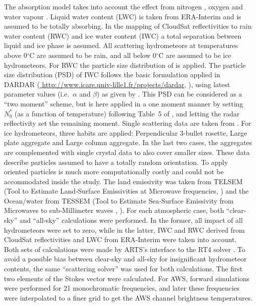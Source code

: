 \documentclass[amt, manuscript]{copernicus}
\begin{document}
The absorption model takes into account the effect from nitrogen
\citep{pwr:93}, oxygen \citep{pwr:93} and water vapour 
\citep{ellison2007permittivity}. Liquid water content (LWC) is taken from ERA-Interim \citep{dee2011erainterim} and is assumed
to be totally absorbing. In the mapping of CloudSat reflectivities to rain water content (RWC) and
ice water content (IWC) a total separation between liquid and ice phase is assumed. All scattering
hydrometeors at temperatures above 0$^\circ$C are assumed to be rain, and all
below 0$^\circ$C are assumed to be ice hydrometeors. For RWC the particle size
distribution of \citet{abel2012improved} is applied. The particle size distribution (PSD) of IWC follows the basic formulation applied in DARDAR (\url{
http://www.icare.univ-lille1.fr/projects/dardar}, \citet{delanoe2008variational}), using latest parameter
values (i.e.\ $\alpha$ and $\beta$) as given by \citet{cazenave2019evolution}.
This PSD can be considered as a ``two moment'' scheme, but is here applied in
a one moment manner by setting $N_0^*$ (as a function of temperature)
following Table~5 of \citet{delanoe2014normalized}, and letting the radar
reflectivity set the remaining moment. Single scattering data are taken from
\citet{eriksson:agene:18}. For ice hydrometeors, three habits are applied:
Perpendicular 3-bullet rosette, Large plate aggregate and Large column
aggregate. In the last two cases, the aggregates are complemented with single
crystal data to also cover smaller sizes. These data describe particles
assumed to have a totally random orientation. To apply oriented particles is
much more computationally costly and could not be accommodated inside the
study. The land emissivity was taken from TELSEM (Tool to Estimate Land‐Surface Emissivities at Microwave frequencies, \citet{aires2011tool}) and the
Ocean/water from TESSEM (Tool to Estimate Sea‐Surface Emissivity from Microwaves to sub‐Millimeter waves , \citet{prigent2017sea}). For each atmospheric case,
both ``clear-sky'' and ``all-sky'' calculations were performed. In the former,
all impact of all hydrometeors were set to zero, while in the latter, IWC and
RWC derived from CloudSat reflectivities and LWC from ERA-Interim were taken
into account. Both sets of calculations were made by ARTS's interface to the
RT4 solver \citep{evans1995microwavec}. To avoid a possible bias between
clear-sky and all-sky for insignificant hydrometeor contents, the same
``scattering solver'' was used for both calculations. The first two elements
of the Stokes vector were calculated. For AWS, forward simulations were performed for 21 monochromatic frequencies, and later these frequencies were interpolated to a finer grid to get the AWS channel brightness temperatures.
\end{document}
